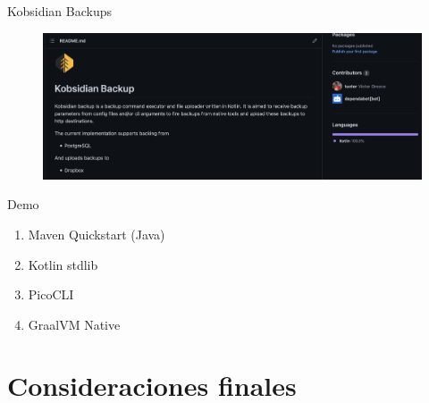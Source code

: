 \documentclass[aspectratio=169]{beamer}
\begin{document}
\begin{frame}{Kobsidian Backups}
	\begin{figure}
		\centering
		\includegraphics[width=\linewidth]{Images/kobsidian.png}
	\end{figure}
\end{frame}


\begin{frame}{Demo}
	\begin{enumerate}
		\item Maven Quickstart (Java)
		\item Kotlin stdlib
        \item PicoCLI
        \item GraalVM Native
	\end{enumerate}
\end{frame}



{
	\section{Consideraciones finales}
}
\end{document}
